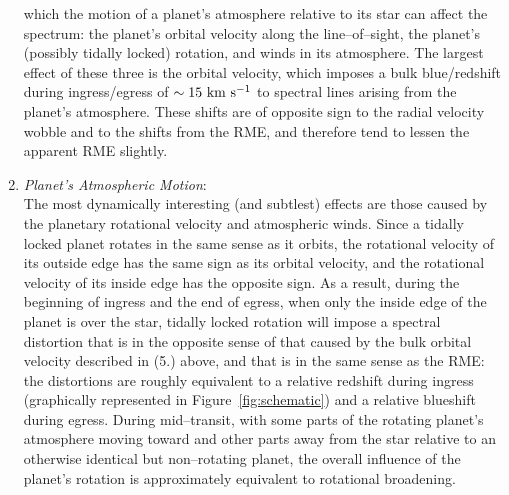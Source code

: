 \documentclass[12pt,preprint]{aastex}
\begin{document}
\begin{enumerate}
which the motion of a planet's atmosphere relative to its star can affect
the spectrum: the planet's orbital velocity along the line--of--sight, the
planet's (possibly tidally locked) rotation, and winds in its atmosphere.
The largest effect of these three is the orbital velocity, which imposes a
bulk blue/redshift during ingress/egress of $\sim 15 {\rm ~km~s^{-1}}$ to
spectral lines arising from the planet's atmosphere.  These shifts are of
opposite sign to the radial velocity wobble and to the shifts from the RME, and
therefore tend to lessen the apparent RME slightly.
\item {\it Planet's Atmospheric Motion}:\\
 The most dynamically interesting (and subtlest) effects are those caused by
the planetary rotational velocity and atmospheric winds.  Since a tidally
locked planet rotates in the same sense as it orbits, the rotational velocity
of its outside edge has the same sign as its orbital velocity, and the
rotational velocity of its inside edge has the opposite sign.  As a result,
during the beginning of ingress and the end of egress, when only the inside
edge of the planet is over the star, tidally locked rotation will impose a
spectral distortion that is in the opposite sense of that caused by the bulk
orbital velocity described in (5.) above, and that is in the same sense
as the RME: the distortions are roughly equivalent to a relative redshift
during ingress (graphically represented in Figure~\ref{fig:schematic})
and a relative blueshift during egress.
During mid--transit, with some parts of the rotating planet's atmosphere
moving toward and other parts away from the star relative to an otherwise
identical but non--rotating planet, the overall influence of the planet's
rotation is approximately equivalent to rotational broadening.


\end{enumerate}
\end{document}
